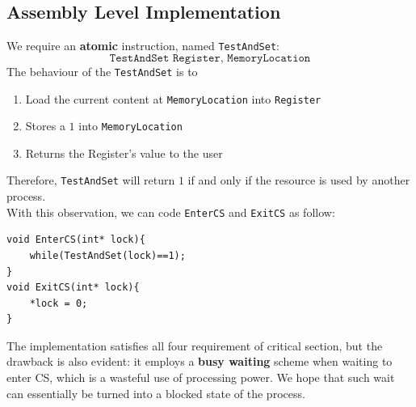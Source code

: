 \documentclass[12pt]{article}
\theoremstyle{definition}
\begin{document}
\subsection{Assembly Level Implementation}
We require an \textbf{atomic} instruction, named \texttt{TestAndSet}:
\[
\texttt{TestAndSet Register, MemoryLocation}
\]
The behaviour of the \texttt{TestAndSet} is to 
\begin{enumerate}
  \item Load the current content at \texttt{MemoryLocation} into \texttt{Register}
  \item Stores a $1$ into \texttt{MemoryLocation}
  \item Returns the Register's value to the user
\end{enumerate}
Therefore, \texttt{TestAndSet} will return $1$ if and only if the resource is used by another process.\\
With this observation, we can code \texttt{EnterCS} and \texttt{ExitCS} as follow:
\begin{verbatim}
void EnterCS(int* lock){
    while(TestAndSet(lock)==1);
}
void ExitCS(int* lock){
    *lock = 0;
}
\end{verbatim}
The implementation satisfies all four requirement of critical section, but the drawback is also evident: it employs a \textbf{busy waiting} scheme when waiting to enter CS, which is a wasteful use of processing power. We hope that such wait can essentially be turned into a blocked state of the process.
\end{document}
